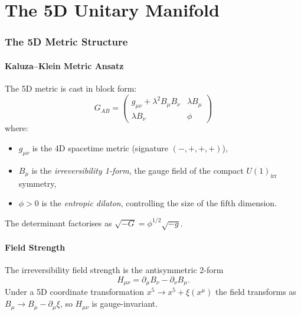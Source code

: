 \documentclass[12pt,a4paper]{article}
\newcommand{\gm}{g_{\mu\nu}}       %
\newcommand{\lam}{\lambda}         %
\begin{document}
\part{The 5D Unitary Manifold}

\section{The 5D Metric Structure}
\label{sec:metric}

\subsection{Kaluza--Klein Metric Ansatz}

The 5D metric is cast in block form:
\begin{equation}
  \boxed{
  G_{AB} = \begin{pmatrix}
    \gm + \lam^2 B_\mu B_\nu & \lam B_\mu \\[4pt]
    \lam B_\nu               & \phi
  \end{pmatrix}
  }
  \label{eq:KK-metric}
\end{equation}
where:
\begin{itemize}
  \item $\gm$ is the 4D spacetime metric (signature $(-,+,+,+)$),
  \item $B_\mu$ is the \emph{irreversibility 1-form}, the gauge field of
        the compact $U(1)_{\text{irr}}$ symmetry,
  \item $\phi > 0$ is the \emph{entropic dilaton}, controlling the size of
        the fifth dimension.
\end{itemize}

The determinant factorises as $\sqrt{-G} = \phi^{1/2}\sqrt{-g}$.

\subsection{Field Strength}

The irreversibility field strength is the antisymmetric 2-form
\begin{equation}
  H_{\mu\nu} = \partial_\mu B_\nu - \partial_\nu B_\mu .
  \label{eq:field-strength}
\end{equation}
Under a 5D coordinate transformation $x^5 \to x^5 + \xi(x^\mu)$ the field
transforms as $B_\mu\to B_\mu - \partial_\mu\xi$, so $H_{\mu\nu}$ is
gauge-invariant.
\end{document}
